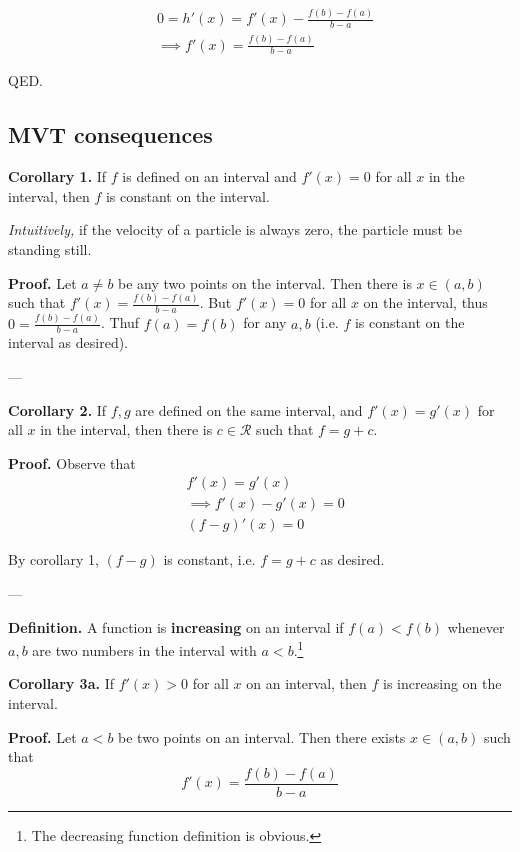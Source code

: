 \begin{align*}
  &0=h'(x)=f'(x)-\frac{f(b)-f(a)}{b-a}\\
  &\implies f'(x)=\frac{f(b)-f(a)}{b-a}
\end{align*}

QED.


\subsection{MVT consequences}
\textbf{Corollary 1.} If $f$ is defined on an interval and $f'(x)=0$
for all $x$ in the interval, then $f$ is constant on the interval.

\vs

\textit{Intuitively,} if the velocity of a particle is always zero,
the particle must be standing still.

\vs

\textbf{Proof.} Let $a\neq b$ be any two points on the interval. Then
there is $x\in(a,b)$ such that $f'(x)=\frac{f(b)-f(a)}{b-a}$. But
$f'(x)=0$ for all $x$ on the interval, thus $0=\frac{f(b)-f(a)}{b-a}$.
Thuf $f(a)=f(b)$ for any $a,b$ (i.e. $f$ is constant on the interval
as desired).

\vs---\vs

\textbf{Corollary 2.} If $f,g$ are defined on the same interval, and
$f'(x)=g'(x)$ for all $x$ in the interval, then there is
$c\in\mathcal{R}$ such that $f=g+c$.

\vs

\textbf{Proof.} Observe that
\begin{align*}
  &f'(x)=g'(x)\\
  &\implies f'(x)-g'(x)=0\\
  &(f-g)'(x)=0
\end{align*}

By corollary 1, $(f-g)$ is constant, i.e. $f=g+c$ as desired.

\vs---\vs

\textbf{Definition.} A function is \textbf{increasing} on an interval
if $f(a)<f(b)$ whenever $a,b$ are two numbers in the interval with
$a<b$.\footnote{The decreasing function definition is obvious.}

\vs

\textbf{Corollary 3a.} If $f'(x)>0$ for all $x$ on an interval, then
$f$ is increasing on the interval.

\vs

\textbf{Proof.} Let $a<b$ be two points on an interval. Then there
exists $x\in(a,b)$ such that
\[f'(x)=\frac{f(b)-f(a)}{b-a}\]

